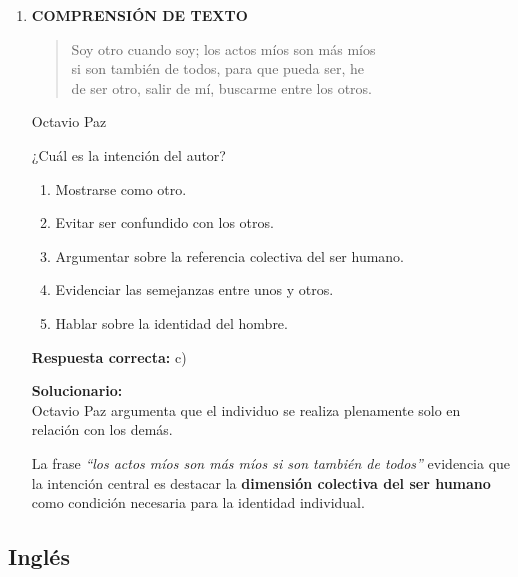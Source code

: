 \begin{enumerate}
	\vspace{2mm}
	\textbf{Solucionario:}\\
	El orden lógico es: primero concluye la secundaria (II), luego expresa su deseo de seguir estudios (IV), después reconoce la competencia y se prepara (III), luego da el examen (V) y finalmente, al ingresar, se proyecta a estudiar la carrera (I).
	

	
	\vspace{6mm}
	
	\item \textbf{COMPRENSIÓN DE TEXTO}
	
	\begin{quote}
		Soy otro cuando soy; los actos míos son más míos\\
		si son también de todos, para que pueda ser, he\\
		de ser otro, salir de mí, buscarme entre los otros.
	\end{quote}
	\hfill Octavio Paz
	
	¿Cuál es la intención del autor?
	\begin{enumerate}[label=\alph*)]
		\item Mostrarse como otro.
		\item Evitar ser confundido con los otros.
		\item Argumentar sobre la referencia colectiva del ser humano.
		\item Evidenciar las semejanzas entre unos y otros.
		\item Hablar sobre la identidad del hombre.
	\end{enumerate}
	\textbf{Respuesta correcta:} c)
	
	\vspace{2mm}
	\textbf{Solucionario:}\\
	Octavio Paz argumenta que el individuo se realiza plenamente solo en relación con los demás.
	
	La frase \textit{``los actos míos son más míos si son también de todos''} evidencia que la intención central es destacar la \textbf{dimensión colectiva del ser humano} como condición necesaria para la identidad individual.
	

	
	\vspace{6mm}
\end{enumerate}

\subsection*{Inglés}

